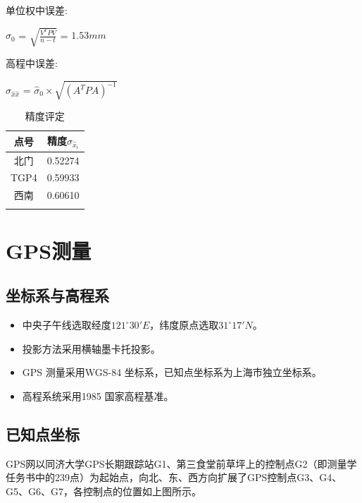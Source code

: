 \documentclass[a4paper,16pt,UTF8]{article}
\begin{document}
\begin{center}
\begin{flushleft}
        单位权中误差:
    \end{flushleft}
    
    $\hat{\sigma}_{0}$ = $\sqrt{\frac{V^{T}PV}{n-t}}$ = $1.53mm$ 

    \begin{flushleft}
        高程中误差:
    \end{flushleft}

    $\sigma_{\hat{x}\hat{x}}$ = $\hat{\sigma}_{0} \times \sqrt{(A^{T}PA)^{-1}}$

    \begin{longtable}{|c|c|}
        \hline
        点号 & 精度$\sigma_{\hat{x}_{i}}$ \\ \hline
        北门 & 0.52274 \\ \hline
        TGP4 & 0.59933 \\ \hline
        西南 & 0.60610 \\ \hline
        \caption{精度评定} \\ 
    \end{longtable}

    
    

\end{center}

\newpage
\section{\LARGE GPS测量}

\subsection{\Large 坐标系与高程系}
\begin{itemize}
    \item 中央子午线选取经度$121^{\circ} 30′ E$，纬度原点选取$31^{\circ} 17′ N$。
    \item 投影方法采用横轴墨卡托投影。
    \item GPS 测量采用WGS-84 坐标系，已知点坐标系为上海市独立坐标系。
    \item 高程系统采用1985 国家高程基准。
\end{itemize}

\subsection{\Large 已知点坐标}
GPS网以同济大学GPS长期跟踪站G1、第三食堂前草坪上的控制点G2（即测量学任务书中的239点）为起始点，向北、东、西方向扩展了GPS控制点G3、G4、G5、G6、G7，各控制点的位置如上图所示。
\end{document}
